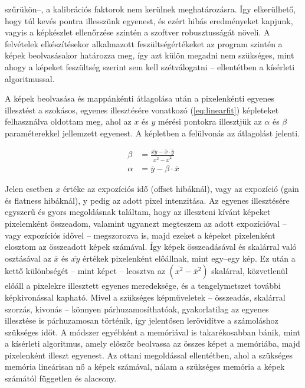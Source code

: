 \documentclass[a4paper,12pt]{article}
\begin{document}
szűrükön--, a kalibrációs  faktorok nem kerülnek meghatározásra. Így elkerülhető, hogy túl kevés pontra illesszünk egyenest, és ezért hibás eredményeket kapjunk, vagyis a képkészlet ellenőrzése szintén a szoftver robusztusságát növeli. A felvételek elkészítésekor alkalmazott feszültségértékeket az program szintén a képek beolvasásakor határozza meg, így azt külön megadni nem szükséges, mint ahogy a képeket feszültség szerint sem kell szétválogatni -- ellentétben a kísérleti algoritmussal.

A képek beolvasása és mappánkénti  átlagolása után a pixelenkénti egyenes illesztést a szokásos, egyenes illesztésére vonatkozó (\ref{eq:linearfit}) képleteket felhasználva oldottam meg, ahol az $x$ és $y$ mérési pontokra illesztjük az $\alpha$ és $\beta$ paraméterekkel jellemzett egyenest.  A képletben a felülvonás az átlagolást jelenti.

\begin{equation}
\label{eq:linearfit}
\begin{split}
\beta &= \frac{ \overline{xy} - \overline x \cdot \overline y }{\overline{x^2} - {\overline{x}}^2}\\
\alpha &= \overline y -\beta \cdot \overline x
\end{split}
\end{equation}


Jelen esetben $x$ értéke az expozíciós idő (offset hibáknál), vagy az expozíció (gain és flatness hibáknál), y pedig az adott pixel intenzitása. Az egyenes illesztésére egyszerű és gyors megoldásnak találtam, hogy az illeszteni kívánt képeket pixelemként összeadom, valamint ugyanezt megteszem az adott expozícióval -- vagy expozíciós idővel -- megszorozva is, majd ezeket a képeket pixelenként elosztom az összeadott képek számával. Így képek összeadásával és skalárral való osztásával az $\overline x$ és $\overline{xy}$ értékek pixelenként előállnak, mint egy--egy kép. Ez után a kettő különbségét -- mint képet -- leosztva az  $\left ( \overline{x^2} - {\overline{x}}^2\right )$ skalárral, közvetlenül előáll a pixelekre illesztett egyenes meredeksége, és a tengelymetszet további képkivonással kapható. Mivel a szükséges képműveletek -- összeadás, skalárral szorzás, kivonás -- könnyen párhuzamosíthatóak, gyakorlatilag az egyenes illesztése is párhuzamosan történik, így jelentősen lerövidítve a számoláshoz szükséges időt. 
 A módszer egyébként a memóriával is takarékosabban bánik, mint a kísérleti algoritmus, amely először beolvassa az összes képet a memóriába, majd pixelenként illeszt egyenest. Az ottani megoldással ellentétben, ahol a szükséges memória lineárisan nő a képek számával, nálam a szükséges memória a képek számától független és alacsony.
\end{document}

